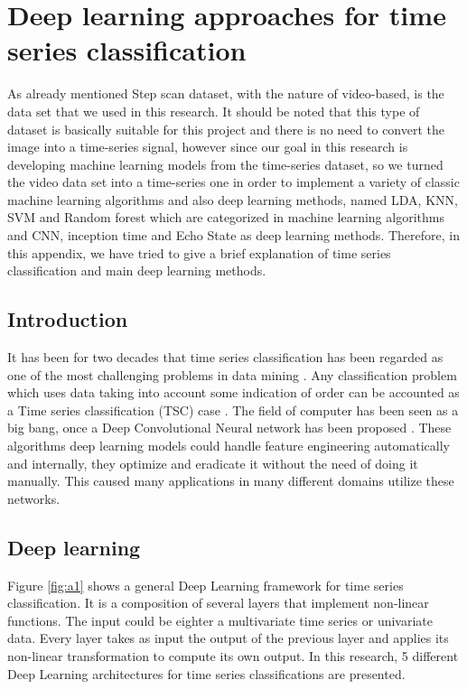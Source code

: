 
\section{Deep learning approaches for time series classification}
\label{appendix:2}

As already mentioned Step scan dataset, with the nature of video-based, is the data set that we used in this research. It should be noted that this type of dataset is basically suitable for this project and there is no need to convert the image into a time-series signal, however since our goal in this research is developing machine learning models from the time-series dataset, so we turned the video data set into a time-series one in order to implement a variety of classic machine learning algorithms and also deep learning methods, named LDA, KNN, SVM and Random forest which are categorized in machine learning algorithms and CNN, inception time and Echo State as deep learning methods. Therefore, in this appendix, we have tried to give a brief explanation of time series classification and main deep learning methods.


\subsection{Introduction}

It has been for two decades that time series classification has been regarded as one of the most challenging problems in data mining \cite{Esling2012Time-seriesMining}. Any classification problem which uses data taking into account some indication of order can be accounted as a Time series classification (TSC) case \cite{Gamboa2017DeepAnalysis}.  The field of computer has been seen as a big bang, once a Deep Convolutional Neural network has been proposed \cite{Krizhevsky2017ImageNetNetworks}. These algorithms deep learning models could handle feature engineering automatically and internally, they optimize and eradicate it without the need of doing it manually. This caused many applications in many different domains utilize these networks.  


\subsection{Deep learning}

Figure \ref{fig:a1} shows a general Deep Learning framework for time series classification. It is a composition of several layers that implement non-linear functions. The input could be eighter a multivariate time series or univariate data. Every layer takes as input the output of the previous layer and applies its non-linear transformation to compute its own output.
In this research, 5 different Deep Learning architectures for time series classifications are presented. 




